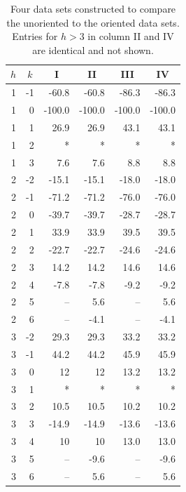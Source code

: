 \begin{table}[htbp]
  \centering
  \begin{tabular}{rrrrrr}
    \hline
    \multicolumn{1}{c}{$h$} & \multicolumn{1}{c}{$k$} & \multicolumn{1}{c}{I} & \multicolumn{1}{c}{II} & \multicolumn{1}{c}{III} & \multicolumn{1}{c}{IV} \\
    \hline    
    1      & -1     & -60.8  & -60.8  & -86.3  & -86.3  \\
    1      & 0      & -100.0 & -100.0 & -100.0 & -100.0 \\
    1      & 1      & 26.9   & 26.9   & 43.1   & 43.1   \\
    1      & 2      & *      & *      & *      & *      \\
    1      & 3      & 7.6    & 7.6    & 8.8    & 8.8    \\
    2      & -2     & -15.1  & -15.1  & -18.0  & -18.0  \\
    2      & -1     & -71.2  & -71.2  & -76.0  & -76.0  \\
    2      & 0      & -39.7  & -39.7  & -28.7  & -28.7  \\
    2      & 1      & 33.9   & 33.9   & 39.5   & 39.5   \\
    2      & 2      & -22.7  & -22.7  & -24.6  & -24.6  \\
    2      & 3      & 14.2   & 14.2   & 14.6   & 14.6   \\
    2      & 4      & -7.8   & -7.8   & -9.2   & -9.2   \\
    2      & 5      & --     & 5.6    & --     & 5.6    \\
    2      & 6      & --     & -4.1   & --     & -4.1   \\
    3      & -2     & 29.3   & 29.3   & 33.2   & 33.2   \\
    3      & -1     & 44.2   & 44.2   & 45.9   & 45.9   \\
    3      & 0      & 12     & 12     & 13.2   & 13.2   \\
    3      & 1      & *      & *      & *      & *      \\
    3      & 2      & 10.5   & 10.5   & 10.2   & 10.2   \\
    3      & 3      & -14.9  & -14.9  & -13.6  & -13.6  \\
    3      & 4      & 10     & 10     & 13.0   & 13.0   \\
    3      & 5      & --     & -9.6   & --     & -9.6   \\
    3      & 6      & --     & 5.6    & --     & 5.6    \\
    \hline
  \end{tabular}%
  \caption{Four data sets constructed to compare the unoriented to
  the oriented data sets. Entries for $h > 3$ in column II and IV are identical 
  and not shown.}
  \label{tab:cmu_vs_wackwebb1}%
\end{table}%

